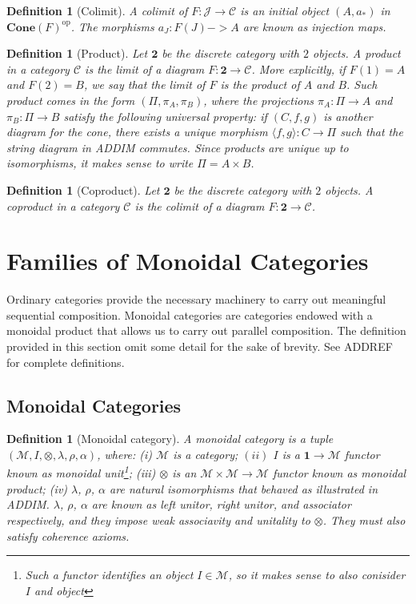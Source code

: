 \documentclass[11pt,a4paper,openright,twoside]{report}
\theoremstyle{plain}
\newtheorem{definition}[proposition]{Definition}
\theoremstyle{definition}
\begin{document}
\begin{definition}[Colimit]
  A colimit of $F: \mathcal{J} \to \mathcal{C}$ is an initial object $(A,a_*)$ in $\mathbf{Cone}(F)^{\mathrm{op}}$. The morphisms $a_J: F(J) -> A$ are known as injection maps.
\end{definition}

\begin{definition}[Product]
  Let $\mathbf{2}$ be the discrete category with $2$ objects. A product in a category $\mathcal{C}$ is the limit of a diagram $F: \mathbf{2} \to \mathcal{C}$. More explicitly, if $F(1) = A$ and $F(2) = B$, we say that the limit of $F$ is the product of $A$ and $B$. Such product comes in the form $(\Pi,\pi_A,\pi_B)$, where the projections $\pi_A: \Pi \to A$ and $\pi_B: \Pi \to B$ satisfy the following universal property: if  $(C,f,g)$ is another diagram for the cone, there exists a unique morphism $\langle f,g \rangle: C \to \Pi$ such that the string diagram in ADDIM commutes. Since products are unique up to isomorphisms, it makes sense to write $\Pi = A \times B$.
\end{definition}

\begin{definition}[Coproduct]
  Let $\mathbf{2}$ be the discrete category with $2$ objects. A coproduct in a category $\mathcal{C}$ is the colimit of a diagram $F: \mathbf{2} \to \mathcal{C}$.
\end{definition}


\section{Families of Monoidal Categories}

Ordinary categories provide the necessary machinery to carry out meaningful sequential composition. Monoidal categories are categories endowed with a monoidal product that allows us to carry out parallel composition. The definition provided in this section omit some detail for the sake of brevity. See ADDREF for complete definitions.

\subsection{Monoidal Categories}

\begin{definition}[Monoidal category]
  A monoidal category is a tuple \\$(\mathcal{M}, I, \otimes, \lambda, \rho, \alpha)$, where: (i) $\mathcal{M}$ is a category; $(ii)$ $I$ is a $\mathbf{1} \to \mathcal{M}$ functor known as monoidal unit\footnote{Such a functor identifies an object $I \in \mathcal{M}$, so it makes sense to also conisider $I$ and object}; (iii) $\otimes$ is an $\mathcal{M} \times \mathcal{M} \to \mathcal{M}$ functor known as monoidal product; (iv) $\lambda$, $\rho$, $\alpha$ are natural isomorphisms that behaved as illustrated in ADDIM. $\lambda$, $\rho$, $\alpha$ are known as left unitor, right unitor, and associator respectively, and they impose weak associavity and unitality to $\otimes$. They must also satisfy coherence axioms.
\end{definition}
\end{document}
